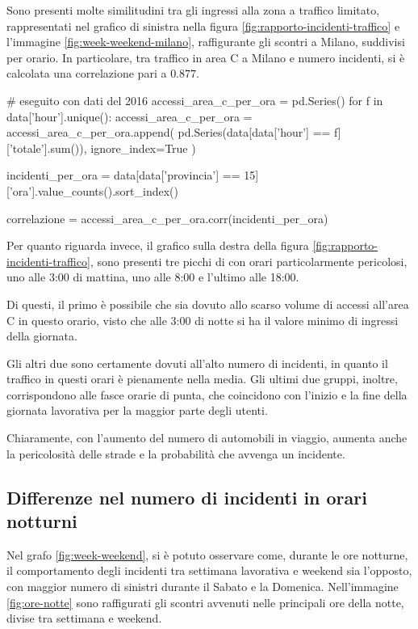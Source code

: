 \documentclass[a4paper,12pt]{report}
\begin{document}
Sono presenti molte similitudini tra gli ingressi alla zona a traffico limitato, 
rappresentati nel grafico di sinistra nella 
figura \ref{fig:rapporto-incidenti-traffico} e l'immagine \ref{fig:week-weekend-milano}, 
raffigurante gli scontri a Milano, suddivisi per orario. 
In particolare, tra traffico in area C a Milano e 
numero incidenti, si è calcolata una correlazione pari a $0.877$. 

\begin{code}
# eseguito con dati del 2016
accessi_area_c_per_ora = pd.Series()
for f in data['hour'].unique():
    accessi_area_c_per_ora = accessi_area_c_per_ora.append(
        pd.Series(data[data['hour'] == f]['totale'].sum()), 
        ignore_index=True
        )

incidenti_per_ora = data[data['provincia'] == 15]['ora'].value_counts().sort_index()

correlazione = accessi_area_c_per_ora.corr(incidenti_per_ora)
\end{code}

Per quanto riguarda invece, il grafico sulla destra della 
figura \ref{fig:rapporto-incidenti-traffico}, sono presenti tre picchi di 
con orari particolarmente pericolosi, uno alle 3:00 di mattina, uno alle 
8:00 e l'ultimo alle 18:00. 

Di questi, il primo è possibile che sia dovuto allo scarso volume di accessi 
all'area C in questo orario, visto che alle 3:00 di notte si ha il valore minimo di 
ingressi della giornata. 

Gli altri due sono certamente dovuti all'alto 
numero di incidenti, in quanto il traffico in questi orari è pienamente nella media. 
Gli ultimi due gruppi, inoltre, corrispondono alle fasce orarie di punta, che coincidono 
con l'inizio e la fine della giornata lavorativa per la maggior parte degli utenti. 

Chiaramente, con l'aumento del numero di automobili in viaggio, aumenta anche 
la pericolosità delle strade e la probabilità che avvenga un incidente. 

\subsection{Differenze nel numero di incidenti in orari notturni}

Nel grafo \ref{fig:week-weekend}, si è potuto osservare come, durante le 
ore notturne, il comportamento degli incidenti tra settimana lavorativa e weekend 
sia l'opposto, con maggior numero di sinistri durante il 
Sabato e la Domenica. 
Nell'immagine \ref{fig:ore-notte} sono raffigurati gli scontri avvenuti 
nelle principali ore della notte, divise tra settimana e weekend. 
\end{document}
